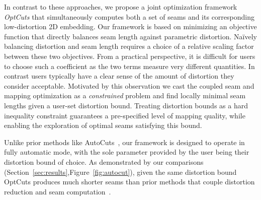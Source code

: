 In contrast to these approaches, we propose a joint optimization framework {\em OptCuts} that simultaneously computes  both a set of seams and its corresponding low-distortion 2D embedding.
Our framework is based on minimizing an objective function that directly balances seam length against parametric distortion. Na\"ively balancing distortion and seam length requires a choice of a relative scaling factor between these two objectives.  From a practical perspective, it is difficult for users to choose such a coefficient as the two terms measure very different quantities. 
In contrast users typically have a clear sense of the amount of distortion they consider acceptable. Motivated by this observation we cast the coupled seam and mapping optimization as a \emph{constrained} problem and find locally minimal seam lengths given a user-set distortion bound. Treating distortion bounds as a hard inequality constraint guarantees a pre-specified level of mapping quality, while enabling the exploration of optimal seams satisfying this bound. %

Unlike prior methods like AutoCuts~\cite{Poranne2017Autocuts}, our framework is designed to operate in fully automatic mode, with the sole parameter provided by the user being their distortion bound of choice. As demonstrated by our comparisons  (Section~\ref{sec:results},Figure~\ref{fig:autocut}), given the same distortion bound  OptCuts produces much shorter seams than prior methods that couple distortion reduction and seam computation~\cite{BoundedDistortParam:2002,Poranne2017Autocuts}. 
  

